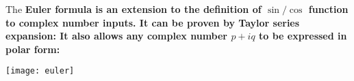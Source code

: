 \documentclass[class=article, crop=false, 12pt]{standalone}
\begin{document}
\begin{notation}
    The \bf{Euler formula} is an extension to the definition of $\sin/\cos$ function to complex number inputs.
    It can be proven by Taylor series expansion:
    It also allows any complex number $p+iq$ to be expressed in polar form:
    \begin{minipage}{0.65\textwidth}
    \end{minipage}
    \begin{minipage}{0.33\textwidth}
        \texttt{[image: euler]}
    \end{minipage}

\end{notation}
\end{document}
